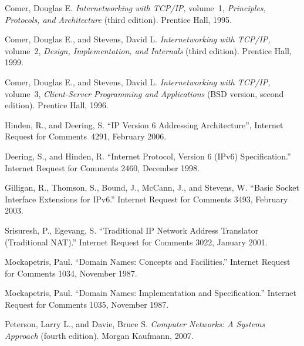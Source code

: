 
\begin{thebibliography}{99}


Comer, Douglas E. \emph{Internetworking with TCP/IP,} volume~1,
\emph{Principles, Protocols, and Architecture} (third edition).
Prentice Hall, 1995.

Comer, Douglas E., and Stevens, David L. \emph{Internetworking with
TCP/IP,} volume~2, \emph{Design, Implementation, and Internals} (third
edition).  Prentice Hall, 1999.

Comer, Douglas E., and Stevens, David L. \emph{Internetworking with
TCP/IP,} volume~3, \emph{Client-Server Programming and Applications}
(BSD version, second edition).
Prentice Hall, 1996.

Hinden, R., and Deering, S.
``IP Version 6 Addressing Architecture'', Internet Request for
Comments~4291, February 2006.

Deering, S., and Hinden, R. ``Internet Protocol, Version 6 (IPv6)
Specification.'' Internet Request for Comments 2460, December 1998.

Gilligan, R., Thomson, S., Bound, J., McCann, J., and Stevens, W.
``Basic Socket Interface Extensions for IPv6.''
Internet  Request for Comments 3493, February 2003.

Srisuresh, P., Egevang, S.
``Traditional IP Network Address Translator (Traditional NAT).''
Internet  Request for Comments 3022, January 2001.


Mockapetris, Paul.
``Domain Names: Concepts and Facilities.''
Internet  Request for Comments 1034, November 1987.

Mockapetris, Paul.
``Domain Names: Implementation and Specification.''
Internet  Request for Comments 1035, November 1987.

Peterson, Larry L., and Davie, Bruce S.
\emph{Computer Networks: A Systems Approach} (fourth edition).
Morgan Kaufmann, 2007.


\end{thebibliography}
